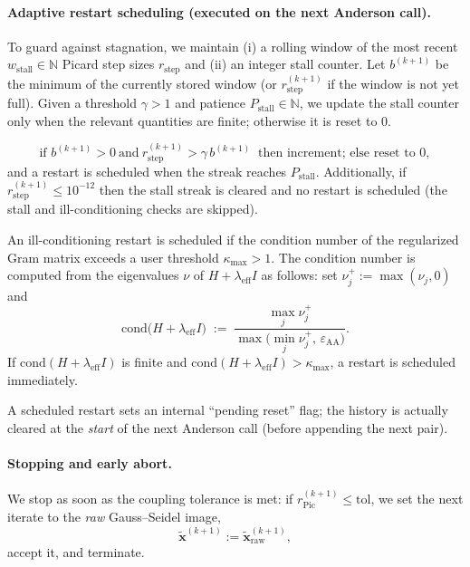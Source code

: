 \paragraph{Adaptive restart scheduling (executed on the next Anderson call).}
To guard against stagnation, we maintain (i) a rolling window of the most recent $w_{\mathrm{stall}}\in\mathbb{N}$ Picard step sizes $r_{\mathrm{step}}$ and (ii) an integer stall counter. Let $b^{(k+1)}$ be the minimum of the currently stored window (or $r_{\mathrm{step}}^{(k+1)}$ if the window is not yet full). Given a threshold $\gamma>1$ and patience $P_{\mathrm{stall}}\in\mathbb{N}$, we update the stall counter only when the relevant quantities are finite; otherwise it is reset to $0$.

\[
\text{if } b^{(k+1)}>0\ \text{and}\ r_{\mathrm{step}}^{(k+1)} > \gamma\, b^{(k+1)}\ \text{ then increment; else reset to }0,
\]
and a restart is scheduled when the streak reaches $P_{\mathrm{stall}}$. Additionally, if $r_{\mathrm{step}}^{(k+1)}\le 10^{-12}$ then the stall streak is cleared and no restart is scheduled (the stall and ill-conditioning checks are skipped).

An ill-conditioning restart is scheduled if the condition number of the regularized Gram matrix exceeds a user threshold $\kappa_{\max}>1$.
The condition number is computed from the eigenvalues $\nu$ of $H+\lambda_{\mathrm{eff}}I$ as follows: set $\nu_j^{+}:=\max(\nu_j,0)$ and
\[
\mathrm{cond}\big(H+\lambda_{\mathrm{eff}}I\big)\;:=\;\frac{\max_j \nu_j^{+}}{\max\!\big(\min_j \nu_j^{+},\,\varepsilon_{\mathrm{AA}}\big)}.
\]
If $\mathrm{cond}(H+\lambda_{\mathrm{eff}}I)$ is finite and $\mathrm{cond}(H+\lambda_{\mathrm{eff}}I)>\kappa_{\max}$, a restart is scheduled immediately.

A scheduled restart sets an internal ``pending reset'' flag; the history is actually cleared at the \emph{start} of the next Anderson call (before appending the next pair).

\paragraph{Stopping and early abort.}
We stop as soon as the coupling tolerance is met:
if $r_{\mathrm{Pic}}^{(k+1)}\le \mathrm{tol}$, we set the next iterate to the \emph{raw} Gauss--Seidel image,
\[
\widetilde{\mathbf{x}}^{(k+1)} := \widetilde{\mathbf{x}}_{\mathrm{raw}}^{(k+1)},
\]
accept it, and terminate.

